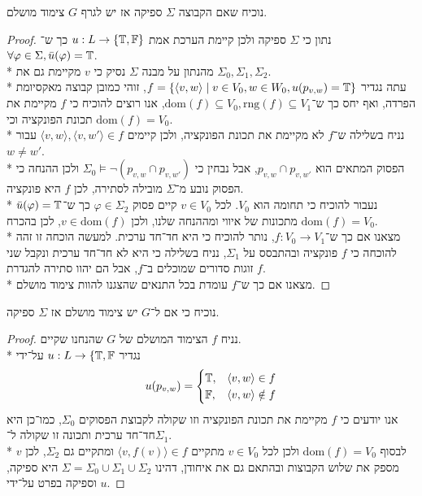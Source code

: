 \Subquestion{}
נוכיח שאם הקבוצה $\Sigma$ ספיקה אז יש לגרף $G$ צימוד מושלם.
\begin{proof}
	נתון כי $\Sigma$ ספיקה ולכן קיימת הערכת אמת $u : L \to \{ \mathbb{T}, \mathbb{F} \}$ כך ש־$\forall \varphi \in \Sigma, \bar{u}(\varphi) = \mathbb{T}$. \\*
	מהנתון על מבנה $\Sigma$ נסיק כי $v$ מקיימת גם את $\Sigma_0, \Sigma_1, \Sigma_2$. \\*
	עתה נגדיר $f = \{ \langle v, w \rangle \mid v \in V_0, w \in W_0, u(p_{v, w}) = \mathbb{T} \}$, זוהי כמובן קבוצה מאקסיומת הפרדה, ואף יחס כך ש־$\text{dom}(f) \subseteq V_0, \text{rng}(f) \subseteq V_1$,
	אנו רוצים להוכיח כי $f$ מקיימת את תכונת הפונקציה וכי $\text{dom}(f) = V_0$. \\*
	נניח בשלילה ש־$f$ לא מקיימת את תכונת הפונקציה, ולכן קיימים $\langle v, w \rangle, \langle v, w' \rangle \in f$ עבור $w \ne w'$. \\*
	הפסוק המתאים הוא $p_{v, w} \cap p_{v, w'}$, אבל נבחין כי $\Sigma_0 \models \lnot (p_{v, w} \cap p_{v, w'})$ ולכן ההנחה כי הפסוק נובע מ־$\Sigma$ מובילה לסתירה, לכן $f$ היא פונקציה. \\*
	נעבור להוכיח כי תחומה הוא $V_0$. לכל $v \in V_0$ קיים פסוק $\varphi \in \Sigma_2$ כך ש־$\bar{u}(\varphi) = \mathbb{T}$ מתכונות של איווי ומההנחה שלנו, ולכן $v \in \text{dom}(f)$, לכן בהכרח $\text{dom}(f) = V_0$. \\*
	מצאנו אם כך ש־$f : V_0 \to V_1$, נותר להוכיח כי היא חד־חד ערכית.
	למעשה הוכחה זו זהה להוכחה כי $f$ פונקציה ובהתבסס על $\Sigma_1$, נניח בשלילה כי היא לא חד־חד ערכית ונקבל שני זוגות סדורים שמוכלים ב־$f$, אבל הם יהוו סתירה להגדרת $f$. \\*
	מצאנו אם כך ש־$f$ עומדת בכל התנאים שהצגנו להוות צימוד מושלם.
\end{proof}

\Subquestion{}
נוכיח כי אם ל־$G$ יש צימוד מושלם אז $\Sigma$ ספיקה.
\begin{proof}
	נניח $f$ הצימוד המושלם של $G$ שהנחנו שקיים. \\*
	נגדיר $u : L \to \{ \mathbb{T}, \mathbb{F}$ על־ידי
		\[
			u(p_{v, w}) = \begin{cases}
				\mathbb{T}, & \langle v, w \rangle \in f \\
				\mathbb{F}, & \langle v, w \rangle \notin f
		\end{cases}
	\]
	אנו יודעים כי $f$ מקיימת את תכונת הפונקציה וזו שקולה לקבוצת הפסוקים $\Sigma_0$, כמו־כן היא חד־חד ערכית ותכונה זו שקולה ל־$\Sigma_1$. \\*
	לבסוף $\text{dom}(f) = V_0$ ולכן לכל $v \in V_0$ מתקיים $\langle v, f(v) \rangle \in f$ ומתקיים גם $\Sigma_2$, לכן $v$ מספק את שלוש הקבוצות ובהתאם גם את איחודן,
	דהינו $\Sigma = \Sigma_0 \cup \Sigma_1 \cup \Sigma_2$ היא ספיקה, וספיקה בפרט על־ידי $u$.
\end{proof}

